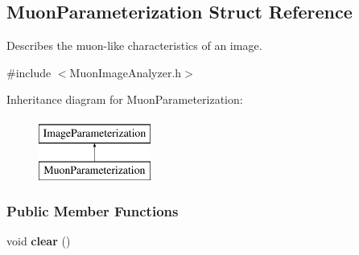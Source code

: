 \hypertarget{structMuonParameterization}{
\subsection{MuonParameterization Struct Reference}
\label{structMuonParameterization}
}


Describes the muon-\/like characteristics of an image.  




{\ttfamily \#include $<$MuonImageAnalyzer.h$>$}

Inheritance diagram for MuonParameterization:\begin{figure}[H]
\begin{center}
\leavevmode
\includegraphics[height=2.000000cm]{structMuonParameterization}
\end{center}
\end{figure}
\subsubsection*{Public Member Functions}
\begin{DoxyCompactItemize}
\item 
\hypertarget{structMuonParameterization_a3f667029da45f04fb632f74538db3fa9}{
void {\bfseries clear} ()}
\label{structMuonParameterization_a3f667029da45f04fb632f74538db3fa9}

\end{DoxyCompactItemize}
